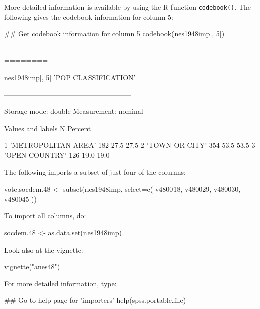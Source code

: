 \documentclass{tufte-book}\usepackage[]{graphicx}\usepackage[]{color}
\newcommand{\txtt}[1]{\texttt{#1}}
\begin{document}
More detailed information is available by using the R function
\txtt{codebook()}.
The following gives the codebook information for  column 5:
\begin{Schunk}
\begin{Sinput}
## Get codebook information for column 5
codebook(nes1948imp[, 5])
\end{Sinput}
\begin{Soutput}
======================================================

   nes1948imp[, 5] 'POP CLASSIFICATION'

------------------------------------------------------

   Storage mode: double
   Measurement: nominal

         Values and labels    N    Percent 
                                           
   1   'METROPOLITAN AREA'  182   27.5 27.5
   2   'TOWN OR CITY'       354   53.5 53.5
   3   'OPEN COUNTRY'       126   19.0 19.0
\end{Soutput}
\end{Schunk}

The following imports a subset of just four of the columns:
\begin{Schunk}
\begin{Sinput}
vote.socdem.48 <- subset(nes1948imp,
              select=c(
                  v480018,
                  v480029,
                  v480030,
                  v480045
                  ))
\end{Sinput}
\end{Schunk}

To import all columns, do:
\begin{Schunk}
\begin{Sinput}
socdem.48 <- as.data.set(nes1948imp)
\end{Sinput}
\end{Schunk}

\begin{marginfigure}[24pt]
Look also at the vignette:\\[-3pt]
\begin{Schunk}
\begin{Sinput}
vignette("anes48")
\end{Sinput}
\end{Schunk}
\end{marginfigure}
For more detailed information, type:
\begin{Schunk}
\begin{Sinput}
## Go to help page for 'importers'
help(spss.portable.file)
\end{Sinput}
\end{Schunk}
\end{document}
